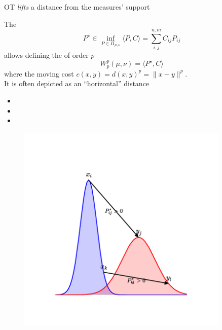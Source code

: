 \documentclass[pdf,aspectratio=169,10pt]{beamer}
\begin{document}
\begin{frame}{OT \emph{lifts} a distance from the measures' support}
    \\
    \begin{minipage}{0.59\textwidth}
        The 
        \begin{equation*}
            P^\star \in \inf_{P\in\Pi_{\mu,\nu}} \langle P , C\rangle = \sum_{i,j}^{n,m} C_{ij}P_{ij} 
        \end{equation*}
        allows defining the  of order $p$
        \begin{equation*}
            W^p_p(\mu, \nu) =  \langle P^\star , C\rangle
        \end{equation*}
        where the moving cost $c(x, y) = {d(x, y)}^p = \| x - y \|^p$.\\
        It is often depicted as an ``horizontal'' distance
\begin{itemize}
          \item[\bred{$\checkmark$}] 
          \item[\bred{$\checkmark$}]  
          \item[\bred{$\checkmark$}] 
      \end{itemize}       
    \end{minipage}
    \hfill
    \begin{minipage}{0.4\textwidth}
    \begin{figure}
        \centering
            \includegraphics[trim={2cm 2cm 2cm 2cm},clip, width=0.9\textwidth]{../img/horizontal_distance.pdf}
        \end{figure}
        \centering

    \end{minipage}
    

\end{frame}
\end{document}

